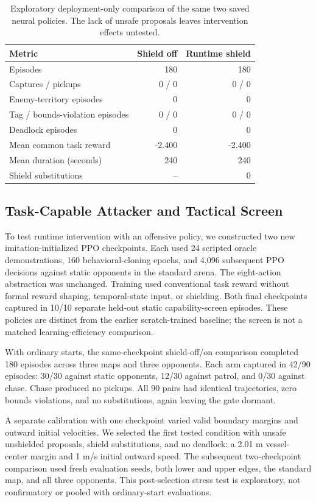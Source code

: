 \documentclass[letterpaper]{article}
\begin{document}
\begin{table}[htbp]
\centering
\small
\setlength{\tabcolsep}{3.5pt}
\begin{tabular}{lrr}
\hline
Metric & Shield off & Runtime shield \\
\hline
Episodes & 180 & 180 \\
Captures / pickups & 0 / 0 & 0 / 0 \\
Enemy-territory episodes & 0 & 0 \\
Tag / bounds-violation episodes & 0 / 0 & 0 / 0 \\
Deadlock episodes & 0 & 0 \\
Mean common task reward & -2.400 & -2.400 \\
Mean duration (seconds) & 240 & 240 \\
Shield substitutions & -- & 0 \\
\hline
\end{tabular}
\caption{Exploratory deployment-only comparison of the same two saved neural policies. The lack of unsafe proposals leaves intervention effects untested.}
\label{tab:runtime-shield}
\end{table}

\subsection{Task-Capable Attacker and Tactical Screen}

To test runtime intervention with an offensive policy, we constructed two new imitation-initialized PPO checkpoints. Each used 24 scripted oracle demonstrations, 160 behavioral-cloning epochs, and 4,096 subsequent PPO decisions against static opponents in the standard arena. The eight-action abstraction was unchanged. Training used conventional task reward without formal reward shaping, temporal-state input, or shielding. Both final checkpoints captured in 10/10 separate held-out static capability-screen episodes. These policies are distinct from the earlier scratch-trained baseline; the screen is not a matched learning-efficiency comparison.

With ordinary starts, the same-checkpoint shield-off/on comparison completed 180 episodes across three maps and three opponents. Each arm captured in 42/90 episodes: 30/30 against static opponents, 12/30 against patrol, and 0/30 against chase. Chase produced no pickups. All 90 pairs had identical trajectories, zero bounds violations, and no substitutions, again leaving the gate dormant.

A separate calibration with one checkpoint varied valid boundary margins and outward initial velocities. We selected the first tested condition with unsafe unshielded proposals, shield substitutions, and no deadlock: a 2.01 m vessel-center margin and 1 m/s initial outward speed. The subsequent two-checkpoint comparison used fresh evaluation seeds, both lower and upper edges, the standard map, and all three opponents. This post-selection stress test is exploratory, not confirmatory or pooled with ordinary-start evaluations.
\end{document}
